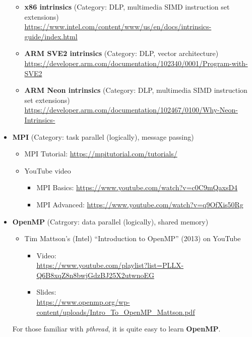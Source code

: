 \documentclass{article}
\begin{document}
\begin{itemize}
    \begin{itemize}
        \item \textbf{x86 intrinsics} (Category: DLP, multimedia SIMD instruction set extensions)\\
        \href{https://www.intel.com/content/www/us/en/docs/intrinsics-guide/index.html}{https://www.intel.com/content/www/us/en/docs/intrinsics-guide/index.html}
        \item \textbf{ARM SVE2 intrinsics} (Category: DLP, vector architecture)\\
        \href{https://developer.arm.com/documentation/102340/0001/Program-with-SVE2}{https://developer.arm.com/documentation/102340/0001/Program-with-SVE2}
        \item \textbf{ARM Neon intrinsics} (Category: DLP, multimedia SIMD instruction set extensions)\\
        \href{https://developer.arm.com/documentation/102467/0100/Why-Neon-Intrinsics-}{https://developer.arm.com/documentation/102467/0100/Why-Neon-Intrinsics-}
    \end{itemize}
    \item \textbf{MPI} (Category: task parallel (logically), message passing)
    \begin{itemize}
        \item MPI Tutorial:
        \href{https://mpitutorial.com/tutorials/}{https://mpitutorial.com/tutorials/}
        \item YouTube video
        \begin{itemize}
            \item MPI Basics:
            \href{https://www.youtube.com/watch?v=c0C9mQaxsD4}{https://www.youtube.com/watch?v=c0C9mQaxsD4}
            \item MPI Advanced:
            \href{https://www.youtube.com/watch?v=q9OfXis50Rg}{https://www.youtube.com/watch?v=q9OfXis50Rg}
        \end{itemize}
    \end{itemize}
    \item \textbf{OpenMP} (Catrgory: data parallel (logically), shared memory)
    \begin{itemize}
        \item Tim Mattson’s (Intel) “Introduction to OpenMP” (2013) on YouTube
        \begin{itemize}
            \item Video:\\
            \href{https://www.youtube.com/playlist?list=PLLX-Q6B8xqZ8n8bwjGdzBJ25X2utwnoEG}{https://www.youtube.com/playlist?list=PLLX-Q6B8xqZ8n8bwjGdzBJ25X2utwnoEG}
            \item Slides:\\
            \href{https://www.openmp.org/wp-content/uploads/Intro\_To\_OpenMP\_Mattson.pdf}{https://www.openmp.org/wp-content/uploads/Intro\_To\_OpenMP\_Mattson.pdf}
        \end{itemize}
    \end{itemize}
    For those familiar with \emph{pthread}, it is quite easy to learn \textbf{OpenMP}.
\end{itemize}
\end{document}
